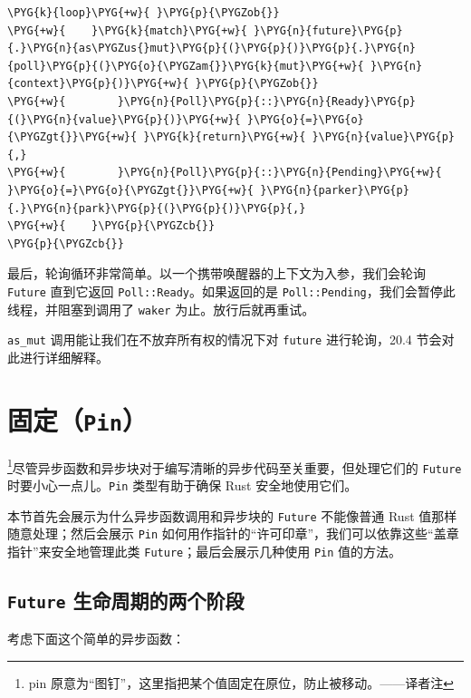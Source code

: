 \begin{Verbatim}[commandchars=\\\{\},breaklines=true,breakanywhere=true,fontsize=\codefont,xleftmargin=17bp]
\PYG{k}{loop}\PYG{+w}{ }\PYG{p}{\PYGZob{}}
\PYG{+w}{    }\PYG{k}{match}\PYG{+w}{ }\PYG{n}{future}\PYG{p}{.}\PYG{n}{as\PYGZus{}mut}\PYG{p}{(}\PYG{p}{)}\PYG{p}{.}\PYG{n}{poll}\PYG{p}{(}\PYG{o}{\PYGZam{}}\PYG{k}{mut}\PYG{+w}{ }\PYG{n}{context}\PYG{p}{)}\PYG{+w}{ }\PYG{p}{\PYGZob{}}
\PYG{+w}{        }\PYG{n}{Poll}\PYG{p}{::}\PYG{n}{Ready}\PYG{p}{(}\PYG{n}{value}\PYG{p}{)}\PYG{+w}{ }\PYG{o}{=}\PYG{o}{\PYGZgt{}}\PYG{+w}{ }\PYG{k}{return}\PYG{+w}{ }\PYG{n}{value}\PYG{p}{,}
\PYG{+w}{        }\PYG{n}{Poll}\PYG{p}{::}\PYG{n}{Pending}\PYG{+w}{ }\PYG{o}{=}\PYG{o}{\PYGZgt{}}\PYG{+w}{ }\PYG{n}{parker}\PYG{p}{.}\PYG{n}{park}\PYG{p}{(}\PYG{p}{)}\PYG{p}{,}
\PYG{+w}{    }\PYG{p}{\PYGZcb{}}
\PYG{p}{\PYGZcb{}}
\end{Verbatim}

最后，轮询循环非常简单。以一个携带唤醒器的上下文为入参，我们会轮询 \texttt{Future} 直到它返回 \texttt{Poll::Ready}。如果返回的是 \texttt{Poll::Pending}，我们会暂停此线程，并阻塞到调用了 \texttt{waker} 为止。放行后就再重试。

\texttt{as\_mut} 调用能让我们在不放弃所有权的情况下对 \texttt{future} 进行轮询，20.4 节会对此进行详细解释。

\section{固定（\texttt{Pin}）}

\footnote{pin 原意为“图钉”，这里指把某个值固定在原位，防止被移动。——译者注}尽管异步函数和异步块对于编写清晰的异步代码至关重要，但处理它们的 \texttt{Future} 时要小心一点儿。\texttt{Pin} 类型有助于确保 Rust 安全地使用它们。

本节首先会展示为什么异步函数调用和异步块的 \texttt{Future} 不能像普通 Rust 值那样随意处理；然后会展示 \texttt{Pin} 如何用作指针的“许可印章”，我们可以依靠这些“盖章指针”来安全地管理此类 \texttt{Future}；最后会展示几种使用 \texttt{Pin} 值的方法。

\subsection{\texttt{Future} 生命周期的两个阶段}

考虑下面这个简单的异步函数：

